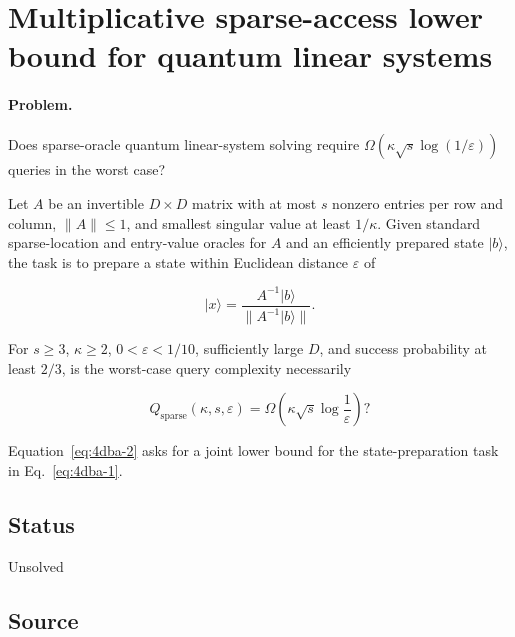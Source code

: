 \section{Multiplicative sparse-access lower bound for quantum linear systems}
\label{sec:op_4dba7a000cf4cd07}

\paragraph{Problem.}
Does sparse-oracle quantum linear-system solving require $\Omega(\kappa\sqrt{s}\log(1/\varepsilon))$ queries in the worst case?

Let $A$ be an invertible $D\times D$ matrix with at most $s$ nonzero entries per row and column, $\|A\|\leq1$, and smallest singular value at least $1/\kappa$. Given standard sparse-location and entry-value oracles for $A$ and an efficiently prepared state $|b\rangle$, the task is to prepare a state within Euclidean distance $\varepsilon$ of

\begin{equation}
|x\rangle=\frac{A^{-1}|b\rangle}{\|A^{-1}|b\rangle\|}.
\label{eq:4dba-1}
\end{equation}

For $s\geq3$, $\kappa\geq2$, $0<\varepsilon<1/10$, sufficiently large $D$, and success probability at least $2/3$, is the worst-case query complexity necessarily

\begin{equation}
Q_{\mathrm{sparse}}(\kappa,s,\varepsilon)
=\Omega\!\left(\kappa\sqrt{s}\log\frac1\varepsilon\right)?
\label{eq:4dba-2}
\end{equation}

Equation~\eqref{eq:4dba-2} asks for a joint lower bound for the state-preparation task in Eq.~\eqref{eq:4dba-1}.

\subsection*{Status}

Unsolved

\subsection*{Source}

